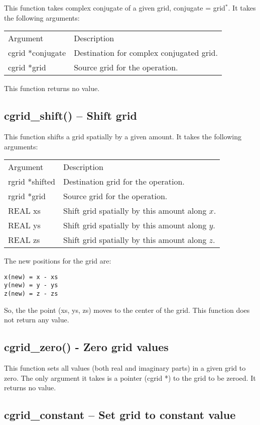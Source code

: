 \documentclass[12pt,letterpaper]{report}
\begin{document}
This function takes complex conjugate of a given grid, conjugate = grid$^*$. It takes the following arguments:
\begin{longtable}{p{} p{}}
Argument & Description\\
\cline{1-2}
cgrid *conjugate & Destination for complex conjugated grid.\\
cgrid *grid & Source grid for the operation.\\
\end{longtable}
\noindent
This function returns no value.

\subsection{cgrid\_shift() -- Shift grid}

This function shifts a grid spatially by a given amount. It takes the following arguments:
\begin{longtable}{p{} p{}}
Argument & Description\\
\cline{1-2}
rgrid *shifted & Destination grid for the operation.\\
rgrid *grid & Source grid for the operation.\\
REAL xs & Shift grid spatially by this amount along $x$.\\
REAL ys & Shift grid spatially by this amount along $y$.\\
REAL zs & Shift grid spatially by this amount along $z$.\\
\end{longtable}
\noindent
The new positions for the grid are:
\begin{verbatim}
x(new) = x - xs 
y(new) = y - ys 
z(new) = z - zs
\end{verbatim}
\noindent
So, the the point (xs, ys, zs) moves to the center of the grid. This function does not return any value.

\subsection{cgrid\_zero() - Zero grid values}

This function sets all values (both real and imaginary parts) in a given grid to zero. The only argument it takes is a pointer (cgrid *) to the grid to be zeroed. It returns no value.

\subsection{cgrid\_constant -- Set grid to constant value}
\end{document}
